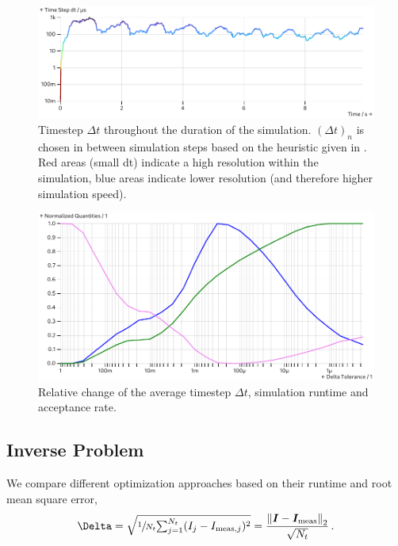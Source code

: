 \documentclass[USenglish,twocolumn]{article}
\begin{document}
  \begin{figure}
    \includegraphics[width=\columnwidth]{../figures/results/dt-plot.pdf}
    \caption{Timestep $\Delta t$ throughout the duration of the simulation. $(\Delta t)_n$ is chosen in between simulation steps based on the heuristic given in . Red areas (small dt) indicate a high resolution within the simulation, blue areas indicate lower resolution (and therefore higher simulation speed).}
    \label{figure:dt-plot}
  \end{figure}

  \begin{figure}
    \includegraphics[width=\columnwidth]{../figures/results/delta-tolerance.pdf}
    \caption{Relative change of the average timestep $\Delta t$, simulation runtime and acceptance rate.}
    \label{figure:delta-tolerance}
  \end{figure}

  \subsection{Inverse Problem}
  We compare different optimization approaches based on their runtime and root mean square error,
  $$\Delta = \sqrt{\sfrac{1}{N_t} {\textstyle \sum_{j=1}^{N_t}} (I_j - I_{{\rm meas}, j})^2} = \frac{\norm{\vec{I} - \vec{I}_{\rm meas}}_2}{\sqrt{N_t}}\,.$$
\end{document}
